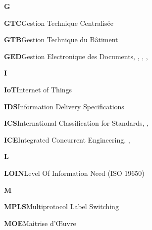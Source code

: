 \documentclass[a4paper,12pt]{article}
\begin{document}
\textbf{G}

\textbf{\hypertarget{gls-176}{GTC}}\hspace*{1em}Gestion Technique Centralisée\hspace*{.5em}\pageref{gls-13-use-1}

\textbf{\hypertarget{gls-177}{GTB}}\hspace*{1em}Gestion Technique du Bâtiment\hspace*{.5em}\pageref{gls-12-use-1}

\textbf{\hypertarget{gls-169}{GED}}\hspace*{1em}Gestion Electronique des Documents\hspace*{.5em}\pageref{gls-7-use-1}, \pageref{gls-7-use-2}, \pageref{gls-7-use-3}, \pageref{gls-7-use-4}, \pageref{gls-7-use-5}

\textbf{I}

\textbf{\hypertarget{gls-194}{IoT}}\hspace*{1em}Internet of Things\hspace*{.5em}\pageref{gls-17-use-1}

\textbf{\hypertarget{gls-189}{IDS}}\hspace*{1em}Information Delivery Specifications\hspace*{.5em}\pageref{gls-8-use-1}

\textbf{\hypertarget{gls-186}{ICS}}\hspace*{1em}International Classification for Standards\hspace*{.5em}\pageref{gls-21-use-1}, \pageref{gls-21-use-2}, \pageref{gls-21-use-3}

\textbf{\hypertarget{gls-185}{ICE}}\hspace*{1em}Integrated Concurrent Engineering\hspace*{.5em}\pageref{gls-3-use-1}, \pageref{gls-3-use-2}, \pageref{gls-3-use-3}

\textbf{L}

\textbf{\hypertarget{gls-209}{LOIN}}\hspace*{1em}Level Of Information Need (ISO 19650)\hspace*{.5em}\pageref{gls-2-use-1}

\textbf{M}

\textbf{\hypertarget{gls-232}{MPLS}}\hspace*{1em}Multiprotocol Label Switching\hspace*{.5em}\pageref{gls-16-use-1}

\textbf{\hypertarget{gls-228}{MOE}}\hspace*{1em}Maitrise d'Œuvre\hspace*{.5em}\pageref{gls-10-use-1}
\end{document}
